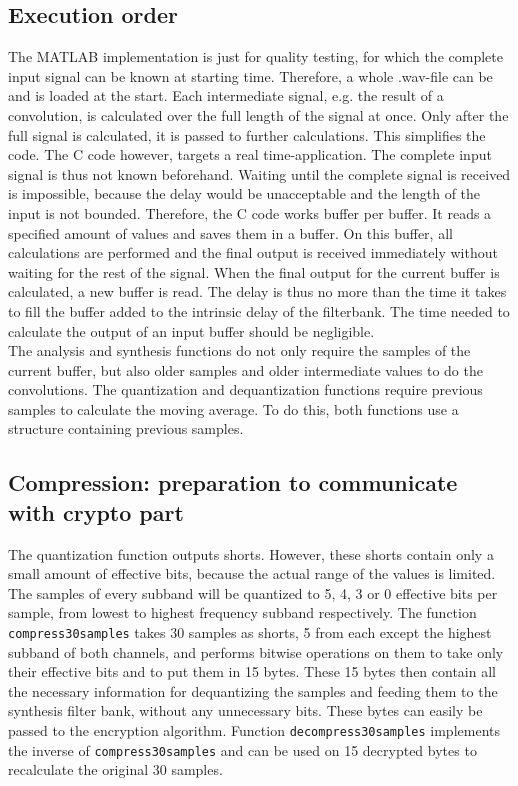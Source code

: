 \documentclass[a4paper]{article}
\begin{document}
\subsection{Execution order}
The MATLAB implementation is just for quality testing, for which the complete input signal can be known at starting time. Therefore, a whole .wav-file can be and is loaded at the start. Each intermediate signal, e.g. the result of a convolution, is calculated over the full length of the signal at once. Only after the full signal is calculated, it is passed to further calculations. This simplifies the code. The C code however, targets a real time-application. The complete input signal is thus not known beforehand. Waiting until the complete signal is received is impossible, because the delay would be unacceptable and the length of the input is not bounded. Therefore, the C code works buffer per buffer. It reads a specified amount of values and saves them in a buffer. On this buffer, all calculations are performed and the final output is received immediately without waiting for the rest of the signal. When the final output for the current buffer is calculated, a new buffer is read. The delay is thus no more than the time it takes to fill the buffer added to the intrinsic delay of the filterbank. The time needed to calculate the output of an input buffer should be negligible. \\

The analysis and synthesis functions do not only require the samples of the current buffer, but also older samples and older intermediate values to do the convolutions. The quantization and dequantization functions require previous samples to calculate the moving average. To do this, both functions use a structure containing previous samples.

\subsection{Compression: preparation to communicate with crypto part}\label{sec:communication}
The quantization function outputs shorts. However, these shorts contain only a small amount of effective bits, because the actual range of the values is limited. The samples of every subband will be quantized to 5, 4, 3 or 0 effective bits per sample, from lowest to highest frequency subband respectively. The function \texttt{compress30samples} takes 30 samples as shorts, 5 from each except the highest subband of both channels, and performs bitwise operations on them to take only their effective bits and to put them in 15 bytes. These 15 bytes then contain all the necessary information for dequantizing the samples and feeding them to the synthesis filter bank, without any unnecessary bits. These bytes can easily be passed to the encryption algorithm. Function \texttt{decompress30samples} implements the inverse of \texttt{compress30samples} and can be used on 15 decrypted bytes to recalculate the original 30 samples.	
\end{document}
